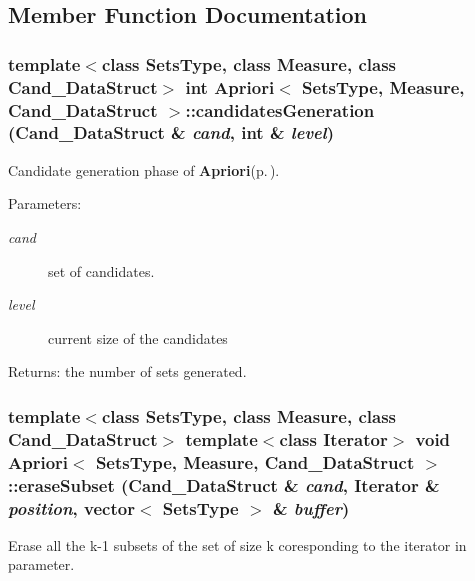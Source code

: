 \subsection{Member Function Documentation}
\subsubsection{\setlength{\rightskip}{0pt plus 5cm}template$<$class Sets\-Type, class Measure, class Cand\_\-Data\-Struct$>$ int {\bf Apriori}$<$ Sets\-Type, Measure, Cand\_\-Data\-Struct $>$::candidates\-Generation (Cand\_\-Data\-Struct \& {\em cand}, int \& {\em level})\hspace{0.3cm}{\tt  [protected]}}\label{class_apriori_f7d6a2dbd1c203246f36081ca1f0e325}


Candidate generation phase of {\bf Apriori}{\rm (p.\,\pageref{class_apriori})}. 

\begin{Desc}
\item[Parameters:]
\begin{description}
\item[{\em cand}]set of candidates. \item[{\em level}]current size of the candidates \end{description}
\end{Desc}
\begin{Desc}
\item[Returns:]the number of sets generated. \end{Desc}
\subsubsection{\setlength{\rightskip}{0pt plus 5cm}template$<$class Sets\-Type, class Measure, class Cand\_\-Data\-Struct$>$ template$<$class Iterator$>$ void {\bf Apriori}$<$ Sets\-Type, Measure, Cand\_\-Data\-Struct $>$::erase\-Subset (Cand\_\-Data\-Struct \& {\em cand}, Iterator \& {\em position}, vector$<$ Sets\-Type $>$ \& {\em buffer})\hspace{0.3cm}{\tt  [protected]}}\label{class_apriori_ea2d007414bb3735d61a1b27a2b14667}


Erase all the k-1 subsets of the set of size k coresponding to the iterator in parameter. 

